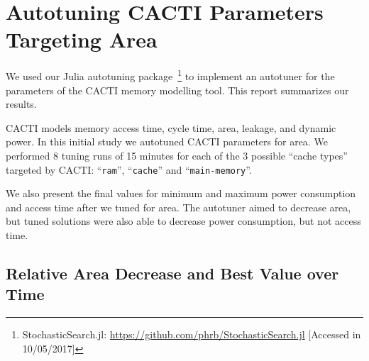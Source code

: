 \documentclass[12pt, a4paper]{article}
\begin{document}
\section{Autotuning CACTI Parameters Targeting Area}

We used our Julia autotuning package~\footnote{StochasticSearch.jl:
\url{https://github.com/phrb/StochasticSearch.jl} [Accessed in 10/05/2017]} to
implement an autotuner for the parameters of the CACTI memory modelling tool.
This report summarizes our results.

CACTI models memory access time, cycle time, area, leakage, and dynamic power.
In this initial study we autotuned CACTI parameters for area.  We performed 8
tuning runs of 15 minutes for each of the 3 possible ``cache types'' targeted
by CACTI: ``\texttt{ram}'', ``\texttt{cache}'' and ``\texttt{main-memory}''.

We also present the final values for minimum and maximum power consumption and
access time after we tuned for area. The autotuner aimed to decrease area, but
tuned solutions were also able to decrease power consumption, but not access
time.

\subsection{Relative Area Decrease and Best Value over Time}
\end{document}

